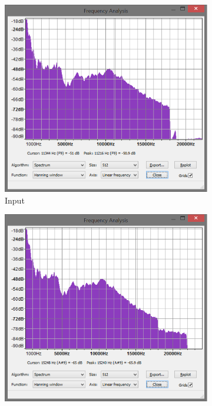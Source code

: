 \documentclass[a4paper,twoside,11pt, fleqn]{article}
\begin{document}
\begin{figure}[h]
	\begin{subfigure}[b]{0.5\textwidth}	
		\includegraphics[scale=0.5]{Images/spectrum_input.png}
		\caption{Input}
	\end{subfigure}
	\begin{subfigure}[b]{0.6\textwidth}	
		\includegraphics[scale=0.5]{Images/spectrum_offline_256.png}

\end{subfigure}
\end{figure}
\end{document}
